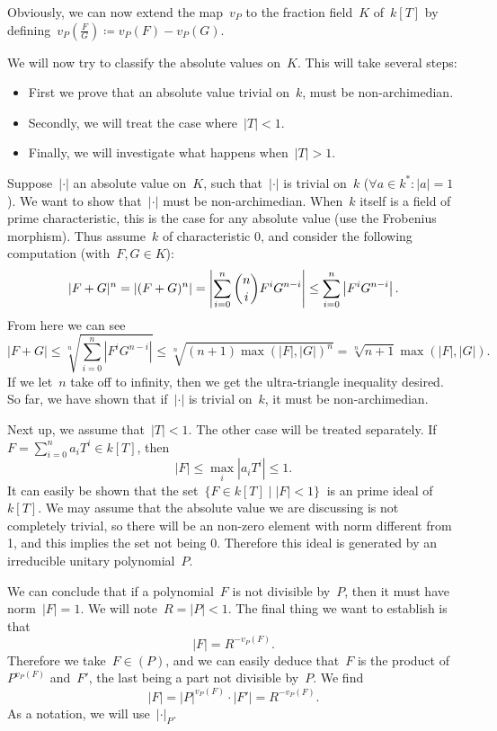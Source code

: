 Obviously, we can now extend the map~$v_P$ to the fraction field~$K$ of~$k[T]$ by defining~$v_P(\frac{F}{G})\coloneqq v_P(F) - v_P(G)$.

We will now try to classify the absolute values on~$K$. This will take several steps:
\begin{itemize}
  \item First we prove that an absolute value trivial on~$k$, must be non-archimedian.
  \item Secondly, we will treat the case where~$|T|<1$.
  \item Finally, we will investigate what happens when~$|T| > 1$.
\end{itemize}

Suppose~$|\cdot|$ an absolute value on~$K$, such that~$|\cdot|$ is trivial on~$k$ ($\forall a \in k^*: |a| = 1$). We want to show that~$|\cdot|$ must be non-archimedian. When~$k$ itself is a field of prime characteristic, this is the case for any absolute value (use the Frobenius morphism). Thus assume~$k$ of characteristic 0, and consider the following computation (with~$F,G \in K$):
\begin{equation}
  |F + G|^n = |(F+G)^n| = \left|\sum_{i=0}^n \dbinom{n}{i}F^i G^{n-i} \right| \leq \sum_{i=0}^n \left| F^i G^{n-i} \right|.
\end{equation}
From here we can see
\begin{equation}
  |F+G| \leq \sqrt[n]{\sum_{i=0}^n \left| F^i G^{n-i} \right|} \leq \sqrt[n]{(n+1)\max(|F|, |G|)^n} = \sqrt[n]{n+1} \max(|F|,|G|).
\end{equation}
If we let~$n$ take off to infinity, then we get the ultra-triangle inequality desired. So far, we have shown that if~$|\cdot|$ is trivial on~$k$, it must be non-archimedian.

Next up, we assume that~$|T|< 1$. The other case will be treated separately.
If~$F = \sum_{i=0}^n a_iT^i \in k[T]$, then~
\begin{equation}
  |F| \leq \max_i |a_iT^i| \leq 1.
\end{equation}
It can easily be shown that the set~$ \{ F \in k[T] \mid |F| < 1 \}~$ is an prime ideal of~$k[T]$. We may assume that the absolute value we are discussing is not completely trivial, so there will be an non-zero element with norm different from 1, and this implies the set not being 0. Therefore this ideal is generated by an irreducible unitary polynomial~$P$.

We can conclude that if a polynomial~$F$ is not divisible by~$P$, then it must have norm~$|F| = 1$. We will note~$R = |P| < 1$. The final thing we want to establish is that~
\begin{equation}
  |F| = R^{-v_P(F)}.
\end{equation}
Therefore we take~$F \in (P)$, and we can easily deduce that~$F$ is the product of~$P^{v_P(F)}$ and~$F'$, the last being a part not divisible by~$P$. We find
\begin{equation}
  |F| = |P|^{v_P(F)}\cdot |F'| = R^{-v_P(F)} .
\end{equation}
As a notation, we will use~$|\cdot|_P$.

